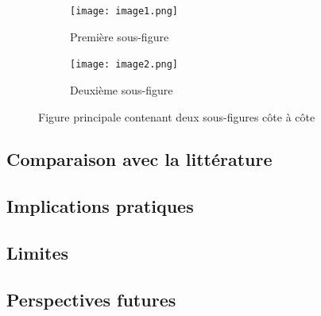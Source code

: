 \begin{figure}[h!]
    \centering
    
    \begin{subfigure}[b]{0.45\textwidth}
        \centering
        \texttt{[image: image1.png]} %
        \caption{Première sous-figure}
        \label{fig:sous-figure1}
    \end{subfigure}
    \hfill %
    
    \begin{subfigure}[b]{0.45\textwidth}
        \centering
        \texttt{[image: image2.png]} %
        \caption{Deuxième sous-figure}
        \label{fig:sous-figure2}
    \end{subfigure}
    
    \caption{Figure principale contenant deux sous-figures côte à côte}
    \label{fig:figure_principale}
\end{figure}

\subsection{Comparaison avec la littérature}

\subsection{Implications pratiques}

\subsection{Limites}

\subsection{Perspectives futures}

